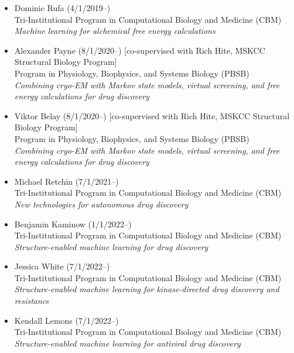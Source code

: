 \documentclass[10pt]{article}
\begin{document}
\begin{itemize}
  \item Dominic Rufa (4/1/2019--)\\
  Tri-Institutional Program in Computational Biology and Medicine (CBM)\\
  \emph{Machine learning for alchemical free energy calculations}

  \item Alexander Payne (8/1/2020--) [co-supervised with Rich Hite, MSKCC Structural Biology Program] \\
  Program in Physiology, Biophysics, and Systems Biology (PBSB)\\
  \emph{Combining cryo-EM with Markov state models, virtual screening, and free energy calculations for drug discovery}
  
  \item Viktor Belay (8/1/2020--) [co-supervised with Rich Hite, MSKCC Structural Biology Program] \\
  Program in Physiology, Biophysics, and Systems Biology (PBSB)\\
  \emph{Combining cryo-EM with Markov state models, virtual screening, and free energy calculations for drug discovery}

  \item Michael Retchin (7/1/2021--) \\
  Tri-Institutional Program in Computational Biology and Medicine (CBM)\\
  \emph{New technologies for autonomous drug discovery}

  \item Benjamin Kaminow (1/1/2022--)\\
  Tri-Institutional Program in Computational Biology and Medicine (CBM)\\
  \emph{Structure-enabled machine learning for drug discovery}
  
  \item Jessica White (7/1/2022--)\\
  Tri-Institutional Program in Computational Biology and Medicine (CBM)\\
  \emph{Structure-enabled machine learning for kinase-directed drug discovery and resistance}  
  
  \item Kendall Lemons (7/1/2022--)\\
  Tri-Institutional Program in Computational Biology and Medicine (CBM)\\
  \emph{Structure-enabled machine learning for antiviral drug discovery}  

\end{itemize}
\end{document}
